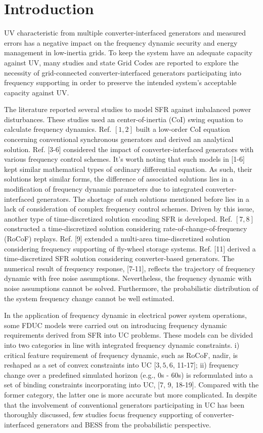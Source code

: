 \documentclass[lettersize,journal]{IEEEtran}
\begin{document}
\section{Introduction}
 UV characteristic from multiple converter-interfaced generators and measured errors has a negative impact on the frequency dynamic security and energy management in low-inertia grids. To keep the system have an adequate capacity against UV, many studies and state Grid Codes are reported to explore the necessity of grid-connected converter-interfaced generators participating into frequency supporting in order to preserve the intended system's acceptable capacity against UV.

The literature reported several studies to model SFR against imbalanced power disturbances. These studies used an center-of-inertia (CoI) swing equation to calculate frequency dynamics. Ref. $[1,2]$ built a low-order CoI equation concerning conventional synchronous generators and derived an analytical solution. Ref. [3-6] considered the impact of converter-interfaced generators with various frequency control schemes. It's worth noting that such models in [1-6] kept similar mathematical types of ordinary differential equation. As such, their solutions kept similar forms, the difference of associated solutions lies in a modification of frequency dynamic parameters due to integrated converter-interfaced generators. The shortage of such solutions mentioned before lies in a lack of consideration of complex frequency control schemes. Driven by this issue, another type of time-discretized solution encoding SFR is developed. Ref. $[7,8]$ constructed a time-discretized solution considering rate-of-change-of-frequency (RoCoF) replays. Ref. [9] extended a multi-area time-discretized solution considering frequency supporting of fly-wheel storage systems. Ref. [11] derived a time-discretized SFR solution considering converter-based generators. The numerical result of frequency response, [7-11], reflects the trajectory of frequency dynamic with free noise assumptions. Nevertheless, the frequency dynamic with noise assumptions cannot be solved. Furthermore, the probabilistic distribution of the system frequency change cannot be well estimated.

In the application of frequency dynamic in electrical power system operations, some FDUC models were carried out on introducing frequency dynamic requirements derived from SFR into UC problems. These models can be divided into two categories in line with integrated frequency dynamic constraints. i) critical feature requirement of frequency dynamic, such as RoCoF, nadir, is reshaped as a set of convex constraints into UC $[3,5,6$, 11-17]; ii) frequency change over a predefined simulated horizon (e.g., 0s - 60s) is reformulated into a set of binding constraints incorporating into UC, [7, 9, 18-19]. Compared with the former category, the latter one is more accurate but more complicated. In despite that the involvement of conventional generators participating in UC has been thoroughly discussed, few studies focus frequency supporting of converter-interfaced generators and BESS from the probabilistic perspective.
\end{document}
